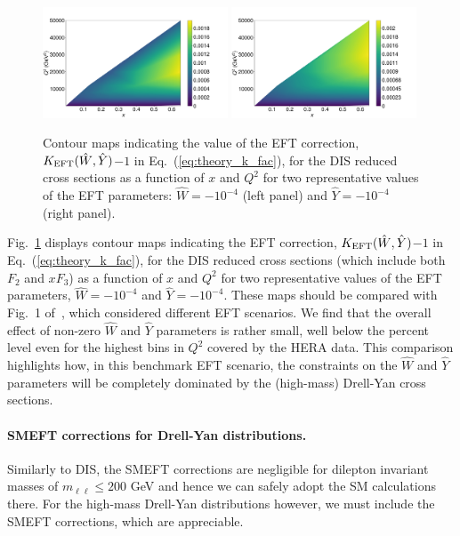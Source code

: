 \documentclass[withindex,glossary]{cam-thesis}
\begin{document}
\begin{figure}[t]
\centering
\includegraphics[width=0.49\textwidth]{dy_figures/disWinterp.pdf}
\includegraphics[width=0.49\textwidth]{dy_figures/disYinterp.pdf}\\
\caption{\small Contour maps indicating the value of the EFT correction, $K_{\rm EFT}(\hat{W},\hat{Y})$$-$$1$ in Eq.~(\ref{eq:theory_k_fac}),
  for the DIS reduced cross sections as a function of $x$ and $Q^2$ for two
  representative values of the EFT parameters: $\hat{W}=-10^{-4}$ (left panel) and $\hat{Y}=-10^{-4}$
  (right panel).
  \label{fig:dissmeft}}
\end{figure}

Fig.~\ref{fig:dissmeft} displays contour maps indicating the EFT correction, $K_{\rm EFT}(\hat{W},\hat{Y})$$-$$1$ in Eq.~(\ref{eq:theory_k_fac}),
  for the DIS reduced cross sections (which include both $F_2$ and $xF_3$) as a function of $x$ and $Q^2$ for two
  representative values of the EFT parameters, $\hat{W}=-10^{-4}$ and $\hat{Y}=-10^{-4}$.
  These maps should be compared with Fig.~1 of~\cite{Carrazza:2019sec}, which considered
   different EFT scenarios.
  We find that the overall effect of
  non-zero $\hat{W}$ and $\hat{Y}$ parameters is rather small, well below the percent level
  even for the highest bins in $Q^2$ covered by the HERA data.
  This comparison highlights how, in this benchmark EFT scenario, the constraints
  on the $\hat{W}$ and $\hat{Y}$ parameters will be completely
  dominated by the (high-mass) Drell-Yan cross sections.

\paragraph{SMEFT corrections for Drell-Yan distributions.}
Similarly to DIS, the SMEFT corrections are negligible for dilepton invariant masses of $m_{\ell\ell}\le 200$
GeV and hence we can safely adopt the SM calculations there. For the high-mass Drell-Yan distributions however,
we must include the SMEFT corrections, which are appreciable.
\end{document}
